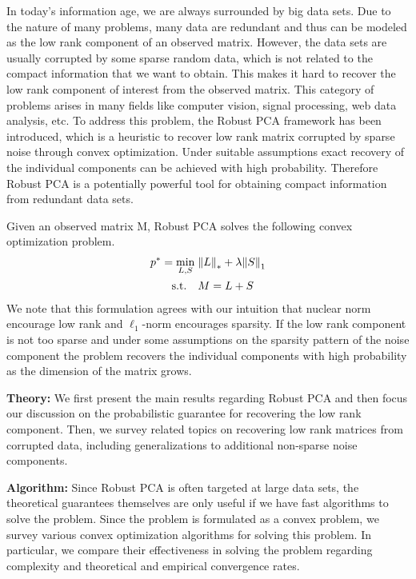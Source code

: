 \documentclass{../../common/projectreport}
\begin{document}
In today’s information age, we are always surrounded by big data sets. Due to the nature of many problems, many data are redundant and thus can be modeled as the low rank component of an observed matrix. However, the data sets are usually corrupted by some sparse random data, which is not related to the compact information that we want to obtain. This makes it hard to recover the low rank component of interest from the observed matrix. This category of problems arises in many fields like computer vision, signal processing, web data analysis, etc. To address this problem, the Robust PCA framework has been introduced, which is a heuristic to recover low rank matrix corrupted by sparse noise through convex optimization. Under suitable assumptions exact recovery of the individual components can be achieved with high probability. Therefore Robust PCA is a potentially powerful tool for obtaining compact information from redundant data sets. 


Given an observed matrix M, Robust PCA solves the following convex optimization problem.  
%
\begin{align*}
p^* = \min_{L,S} \; &{\left\|L\right\|}_{*}^{} + \lambda {\left\|S\right\|}_{1}^{} \\
\text{s.t.} \quad &M = L+S
\end{align*}
%
We note that this formulation agrees with our intuition that nuclear norm encourage low rank and $\ell_1\!$-norm encourages sparsity. If the low rank component is not too sparse and under some assumptions on the sparsity pattern of the noise component the problem recovers the individual components with high probability as the dimension of the matrix grows. 

\textbf{Theory:}
We first present the main results regarding Robust PCA and then focus our discussion on the probabilistic guarantee for recovering the low rank component. Then, we survey related topics on recovering low rank matrices from corrupted data, including generalizations to additional non-sparse noise components. 

\textbf{Algorithm:}
Since Robust PCA is often targeted at large data sets, the theoretical guarantees themselves are only useful if we have fast algorithms to solve the problem. Since the problem is formulated as a convex problem, we survey various convex optimization algorithms for solving this problem. In particular, we compare their effectiveness in solving the problem regarding complexity and theoretical and empirical convergence rates.  
\end{document}
